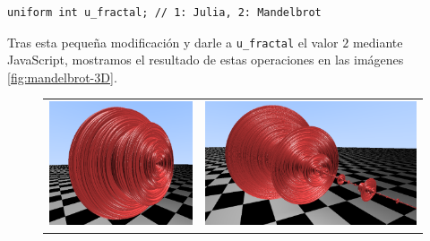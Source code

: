\begin{lstlisting}
uniform int u_fractal; // 1: Julia, 2: Mandelbrot 
\end{lstlisting}

Tras esta pequeña modificación y darle a \verb|u_fractal| el valor $2$ mediante JavaScript, mostramos el resultado de estas operaciones en las imágenes \ref{fig:mandelbrot-3D}.

\begin{figure}[ht]
    \centering
    \begin{tabular}{cc}
        \includegraphics[scale=0.33]{img/C8/mandelbrot-2.png} &
      \includegraphics[scale=0.33]{img/C8/mandelbrot-1.png} \\    

\end{tabular}
\end{figure}

